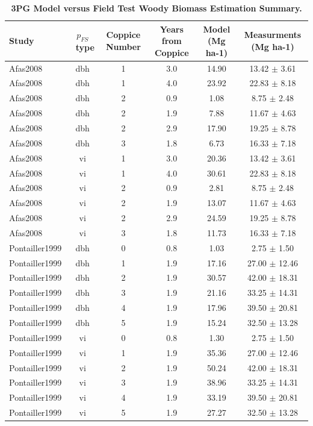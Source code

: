 \documentclass[10pt]{article}
\newcommand{\pfs}{\ensuremath{p_{FS}}}
\begin{document}
\begin{table}%
\caption{\textbf{3PG Model versus Field Test Woody Biomass Estimation Summary.}}
\begin{tabular}{|l|c|c|c|c|c|}
\hline
Study & \pfs~type & Coppice Number & Years from Coppice & Model (Mg ha-1) & Measurments (Mg ha-1) \\
\hline
Afas2008 & dbh & 1 & 3.0 & 14.90 & 13.42 $\pm$ 3.61\\
Afas2008 & dbh & 1 & 4.0 & 23.92 & 22.83 $\pm$ 8.18\\
Afas2008 & dbh & 2 & 0.9 & 1.08 & 8.75 $\pm$ 2.48\\
Afas2008 & dbh & 2 & 1.9 & 7.88 & 11.67 $\pm$ 4.63\\
Afas2008 & dbh & 2 & 2.9 & 17.90 & 19.25 $\pm$ 8.78\\
Afas2008 & dbh & 3 & 1.8 & 6.73 & 16.33 $\pm$ 7.18\\
Afas2008 & vi & 1 & 3.0 & 20.36 & 13.42 $\pm$ 3.61\\
Afas2008 & vi & 1 & 4.0 & 30.61 & 22.83 $\pm$ 8.18\\
Afas2008 & vi & 2 & 0.9 & 2.81 & 8.75 $\pm$ 2.48\\
Afas2008 & vi & 2 & 1.9 & 13.07 & 11.67 $\pm$ 4.63\\
Afas2008 & vi & 2 & 2.9 & 24.59 & 19.25 $\pm$ 8.78\\
Afas2008 & vi & 3 & 1.8 & 11.73 & 16.33 $\pm$ 7.18\\
Pontailler1999 & dbh & 0 & 0.8 & 1.03 & 2.75 $\pm$ 1.50\\
Pontailler1999 & dbh & 1 & 1.9 & 17.16 & 27.00 $\pm$ 12.46\\
Pontailler1999 & dbh & 2 & 1.9 & 30.57 & 42.00 $\pm$ 18.31\\
Pontailler1999 & dbh & 3 & 1.9 & 21.16 & 33.25 $\pm$ 14.31\\
Pontailler1999 & dbh & 4 & 1.9 & 17.96 & 39.50 $\pm$ 20.81\\
Pontailler1999 & dbh & 5 & 1.9 & 15.24 & 32.50 $\pm$ 13.28\\
Pontailler1999 & vi & 0 & 0.8 & 1.30 & 2.75 $\pm$ 1.50\\
Pontailler1999 & vi & 1 & 1.9 & 35.36 & 27.00 $\pm$ 12.46\\
Pontailler1999 & vi & 2 & 1.9 & 50.24 & 42.00 $\pm$ 18.31\\
Pontailler1999 & vi & 3 & 1.9 & 38.96 & 33.25 $\pm$ 14.31\\
Pontailler1999 & vi & 4 & 1.9 & 33.19 & 39.50 $\pm$ 20.81\\
Pontailler1999 & vi & 5 & 1.9 & 27.27 & 32.50 $\pm$ 13.28\\

\end{tabular}
\end{table}
\end{document}

